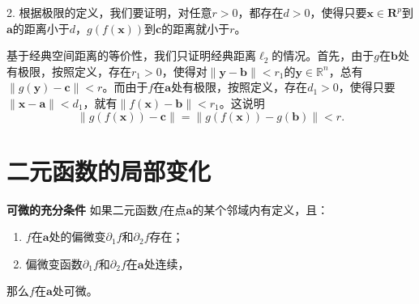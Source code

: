 \documentclass[12pt,UTF8]{ctexbook}
\begin{document}
\begin{appendix}
2. 根据极限的定义，我们要证明，对任意$r>0$，都存在$d>0$，使得只要$\mathbf{x}\in\mathbf{R}^p$到$\mathbf{a}$的距离小于$d$，$g(f(\mathbf{x}))$到$\mathbf{c}$的距离就小于$r$。

基于经典空间距离的等价性，我们只证明经典距离$\ell_2$的情况。首先，由于$g$在$\mathbf{b}$处有极限，按照定义，存在$r_1>0$，使得对$\|\mathbf{y} - \mathbf{b}\| < r_1$的$\mathbf{y}\in\mathbb{R}^n$，总有$\|g(\mathbf{y}) - \mathbf{c} \| < r$。而由于$f$在$\mathbf{a}$处有极限，按照定义，存在$d_1 > 0$，使得只要$\|\mathbf{x} - \mathbf{a}\| < d_1$，就有$\| f(\mathbf{x}) - \mathbf{b}\| < r_1$。这说明
    $$\| g(f(\mathbf{x})) - \mathbf{c}\| = \| g(f(\mathbf{x})) - g(\mathbf{b})\| < r.$$

\section{二元函数的局部变化}
\begin{tm}{\textbf{可微的充分条件}}
如果二元函数$f$在点$\mathbf{a}$的某个邻域内有定义，且：
\begin{enumerate}
\item $f$在$\mathbf{a}$处的偏微变$\partial_1 f$和$\partial_2 f$存在；
\item 偏微变函数$\partial_1 f$和$\partial_2 f$在$\mathbf{a}$处连续，
\end{enumerate}
那么$f$在$\mathbf{a}$处可微。
\end{tm}


\end{appendix}
\end{document}
